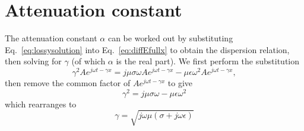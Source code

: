 \documentclass{tufte-handout}
\begin{document}
\section{Attenuation constant}
The attenuation constant $\alpha$ can be worked out by substituting Eq.~\ref{eq:lossysolution} into Eq.~\ref{eq:diffEfullx} to obtain the dispersion relation, then solving for $\gamma$ (of which $\alpha$ is the real part). 
We first perform the substitution
\begin{equation}
\gamma^{2}Ae^{j\omega{}t-\gamma{}x} = j\mu\sigma\omega{}Ae^{j\omega{}t-\gamma{}x} - \mu\epsilon\omega^{2}Ae^{j\omega{}t-\gamma{}x},
\end{equation}
then remove the common factor of $Ae^{j\omega{}t-\gamma{}x}$ to give
\begin{equation}
\gamma^{2} = j\mu\sigma\omega - \mu\epsilon\omega^{2}
\end{equation}
which rearranges to 
\begin{equation}
\gamma = \sqrt{j\omega\mu\left(\sigma + j\omega\epsilon\right)}
\end{equation}
\end{document}
